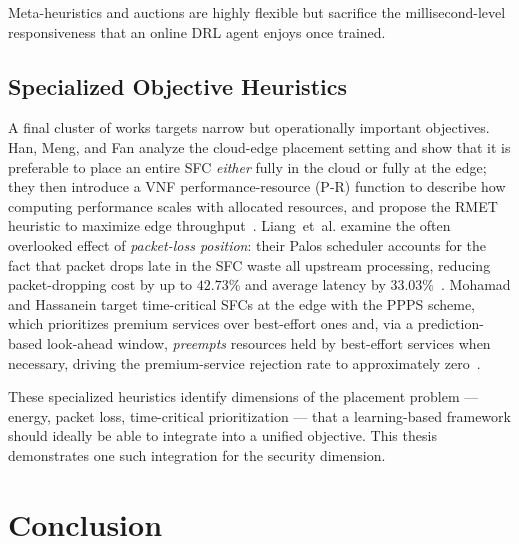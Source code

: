 Meta-heuristics and auctions are highly flexible but sacrifice the
millisecond-level responsiveness that an online DRL agent enjoys
once trained.

\subsection{Specialized Objective Heuristics}

A final cluster of works targets narrow but operationally important
objectives. Han, Meng, and Fan analyze the cloud-edge placement
setting and show that it is preferable to place an entire SFC
\textit{either} fully in the cloud or fully at the edge; they then
introduce a VNF performance-resource (P-R) function to describe
how computing performance scales with allocated resources, and
propose the RMET heuristic to maximize edge
throughput~\cite{han_sfc_2024}. Liang~et~al. examine the often
overlooked effect of \emph{packet-loss position}: their Palos
scheduler accounts for the fact that packet drops late in the SFC
waste all upstream processing, reducing packet-dropping cost by up to
$42.73\%$ and average latency by
$33.03\%$~\cite{liang_position-aware_2024}. Mohamad and Hassanein
target time-critical SFCs at the edge with the PPPS scheme, which
prioritizes premium services over best-effort ones and, via a
prediction-based look-ahead window, \emph{preempts} resources held by
best-effort services when necessary, driving the premium-service
rejection rate to approximately
zero~\cite{mohamad_preemptive_2024}.

These specialized heuristics identify dimensions of the placement
problem --- energy, packet loss, time-critical prioritization --- that
a learning-based framework should ideally be able to integrate into a
unified objective. This thesis demonstrates one such integration for
the security dimension.

\section{Conclusion}
\label{sec:lr_synthesis}

